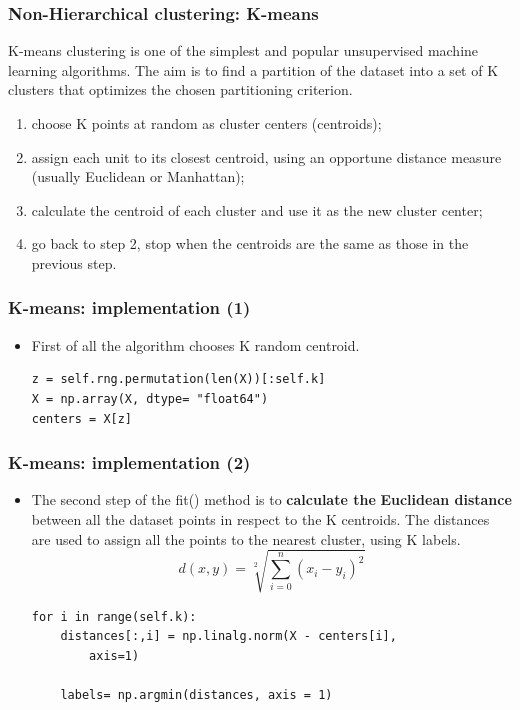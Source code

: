 \documentclass[xcolor ={table,usenames,dvipsnames}]{beamer}
\theoremstyle{definition}
\begin{document}
	\begin{frame}
		\frametitle{Non-Hierarchical clustering: K-means}
		K-means clustering is one of the simplest and popular unsupervised machine learning algorithms. The aim is to find a partition of the dataset into a set of K clusters that optimizes the chosen partitioning criterion.
		
		\begin{enumerate}
			\item choose K points at random as cluster centers
			(centroids);
			\item assign each unit to its closest centroid,
			using an opportune distance measure (usually Euclidean or Manhattan);
			\item calculate the centroid of each cluster and use it as
			the new cluster center;
			\item go back to step 2, stop when the centroids are the same as those in the previous step.
		\end{enumerate}
	\end{frame}

	\begin{frame}[fragile]
		\frametitle{K-means: implementation (1)}
		\begin{itemize}
			\item First of all the algorithm chooses K random centroid.
			\begin{lstlisting}
z = self.rng.permutation(len(X))[:self.k]
X = np.array(X, dtype= "float64")
centers = X[z]
			\end{lstlisting}
			
		\end{itemize}
	\end{frame}

	\begin{frame}[fragile]
		\frametitle{K-means: implementation (2)}
		\begin{itemize}
			\item The second step of the fit() method is to \textbf{calculate the} \textbf{Euclidean distance} between all the dataset points in respect to the K centroids. The distances are used to assign all the points to the nearest cluster, using K labels. 
			$$d(x,y) = \sqrt[2]{\sum_{i=0}^n (x_{i} - y_{i})^{2}} $$
			\begin{lstlisting}
for i in range(self.k):
	distances[:,i] = np.linalg.norm(X - centers[i],
		axis=1)	
			
	labels= np.argmin(distances, axis = 1)
			\end{lstlisting}
		\end{itemize}
		
	\end{frame}
\end{document}
